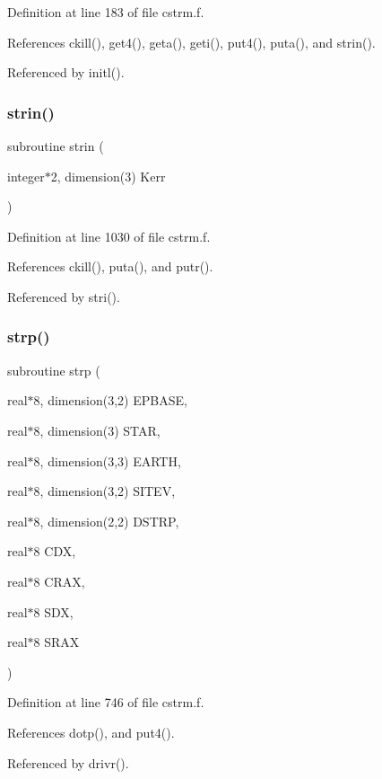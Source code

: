 Definition at line 183 of file cstrm.\+f.



References ckill(), get4(), geta(), geti(), put4(), puta(), and strin().



Referenced by initl().

\mbox{\label{cstrm_8f_ac40e28cce05ed1dd7c0f0dc668c7e041}} 
\subsubsection{\texorpdfstring{strin()}{strin()}}
{\footnotesize\ttfamily subroutine strin (\begin{DoxyParamCaption}\item[{integer$\ast$2, dimension(3)}]{Kerr }\end{DoxyParamCaption})}



Definition at line 1030 of file cstrm.\+f.



References ckill(), puta(), and putr().



Referenced by stri().

\mbox{\label{cstrm_8f_abd2539dadf01efc58dae10cbed8b911e}} 
\subsubsection{\texorpdfstring{strp()}{strp()}}
{\footnotesize\ttfamily subroutine strp (\begin{DoxyParamCaption}\item[{real$\ast$8, dimension(3,2)}]{E\+P\+B\+A\+SE,  }\item[{real$\ast$8, dimension(3)}]{S\+T\+AR,  }\item[{real$\ast$8, dimension(3,3)}]{E\+A\+R\+TH,  }\item[{real$\ast$8, dimension(3,2)}]{S\+I\+T\+EV,  }\item[{real$\ast$8, dimension(2,2)}]{D\+S\+T\+RP,  }\item[{real$\ast$8}]{C\+DX,  }\item[{real$\ast$8}]{C\+R\+AX,  }\item[{real$\ast$8}]{S\+DX,  }\item[{real$\ast$8}]{S\+R\+AX }\end{DoxyParamCaption})}



Definition at line 746 of file cstrm.\+f.



References dotp(), and put4().



Referenced by drivr().

